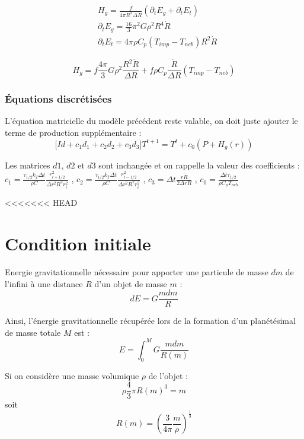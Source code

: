 \documentclass[10pt,a4paper]{article}
\numberwithin{equation}{section}
\begin{document}
\begin{align}
 &H_g = \frac{f}{4 \pi R^2 \Delta R}(\partial_{t} E_g + \partial_{t} E_t) \\
 &\partial_{t} E_g =\frac{16}{3} \pi^2 G \rho^2 R^4 \dot R \\
 &\partial_{t} E_t = 4 \pi \rho C_p ( T_{imp} - T_{neb} ) R^2 \dot R
\end{align}


\begin{equation}
H_g = f \frac{4 \pi}{3} G \rho^2 \frac{R^2\dot R}{\Delta R} + f \rho C_p \frac{\dot R}{\Delta R} ( T_{imp} - T_{neb} )
\end{equation}


\subsubsection{Équations discrétisées}

L'équation matricielle du modèle précédent reste valable, on doit juste ajouter le terme de production supplémentaire :
\begin{equation}
\Big [ Id + 
c_1  d_1 +  
c_2  d_2 +
c_3  d_3
 \Big] T^{t+1} = T^t + c_0 (P + H_g(r))
\end{equation}

Les matrices $d1$, $d2$ et $d3$ sont inchangée et on rappelle la valeur des coefficients : \\
$c_1 = \frac{\tau_{1/2} k_T \Delta t }{\rho C  }
\frac{r^2_{i+1/2}}{\Delta r^2 R^2 r^2_i}$
, $c_2 = \frac{\tau_{1/2} k_T \Delta t }{\rho C  }
\frac{r^2_{i-1/2}}{\Delta r^2 R^2 r^2_i}$
, $c_3 = \Delta t \frac{ r \dot{R}}{2\Delta r R}$
, $c_0 = \frac{\Delta t \tau_{1/2} }{\rho C_p T_{neb}}$ 

<<<<<<< HEAD
\section{Condition initiale}

Energie gravitationnelle nécessaire pour apporter une particule de masse $dm$ de l'infini à une distance $R$ d'un objet de masse $m$ :
$$ dE = G \frac{m dm}{R}$$ 

Ainsi, l'énergie gravitationnelle récupérée lors de la formation d'un planétésimal de masse totale $M$ est :
$$ E = \int_0^M G \frac{m dm}{R(m)}$$

Si on considère une masse volumique $\rho$ de l'objet :
$$\rho\frac{4}{3}\pi R(m)^3=m$$
soit 
$$R(m)=\left(\frac{3}{4\pi}\frac{m}{\rho}\right)^{\frac{1}{3}}$$
\end{document}
